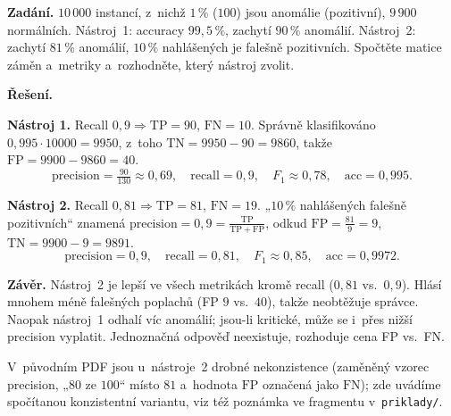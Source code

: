 \begin{priklad}
\par
\textbf{Zadání.} $10\,000$ instancí, z~nichž $1\,\%$ ($100$) jsou anomálie (pozitivní), $9\,900$ normálních. Nástroj~1: accuracy $99{,}5\,\%$, zachytí $90\,\%$ anomálií. Nástroj~2: zachytí $81\,\%$ anomálií, $10\,\%$ nahlášených je falešně pozitivních. Spočtěte matice záměn a~metriky a~rozhodněte, který nástroj zvolit.

\smallskip
\textbf{Řešení.}

\textbf{Nástroj 1.} Recall $0{,}9\Rightarrow \mathrm{TP}=90$, $\mathrm{FN}=10$. Správně klasifikováno $0{,}995\cdot 10000=9950$, z~toho $\mathrm{TN}=9950-90=9860$, takže $\mathrm{FP}=9900-9860=40$.
\[ \text{precision}=\tfrac{90}{130}\approx 0{,}69,\quad \text{recall}=0{,}9,\quad F_1\approx 0{,}78,\quad \mathrm{acc}=0{,}995. \]

\textbf{Nástroj 2.} Recall $0{,}81\Rightarrow \mathrm{TP}=81$, $\mathrm{FN}=19$. „$10\,\%$ nahlášených falešně pozitivních`` znamená $\text{precision}=0{,}9=\frac{\mathrm{TP}}{\mathrm{TP}+\mathrm{FP}}$, odkud $\mathrm{FP}=\tfrac{81}{9}=9$, $\mathrm{TN}=9900-9=9891$.
\[ \text{precision}=0{,}9,\quad \text{recall}=0{,}81,\quad F_1\approx 0{,}85,\quad \mathrm{acc}=0{,}9972. \]

\textbf{Závěr.} Nástroj~2 je lepší ve všech metrikách kromě recall ($0{,}81$ vs.\ $0{,}9$). Hlásí mnohem méně falešných poplachů (FP $9$ vs.\ $40$), takže neobtěžuje správce. Naopak nástroj~1 odhalí víc anomálií; jsou-li kritické, může se i~přes nižší precision vyplatit. Jednoznačná odpověď neexistuje, rozhoduje cena FP vs.\ FN.

\smallskip
\noindent\footnotesize V~původním PDF jsou u~nástroje~2 drobné nekonzistence (zaměněný vzorec precision, „$80$ ze $100$`` místo $81$ a~hodnota $\mathrm{FP}$ označená jako $\mathrm{FN}$); zde uvádíme spočítanou konzistentní variantu, viz též poznámka ve fragmentu v~\texttt{priklady/}.
\end{priklad}

